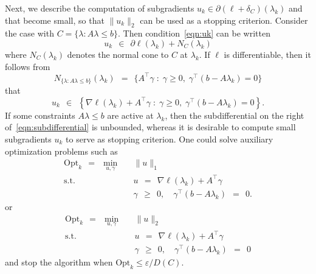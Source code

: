 \documentclass[article]{jss}
\newcommand{\ignore}[1]{}
\begin{document}
{Next, we describe the computation of subgradients $u_{k} \in \partial(\ell + \delta_{C})(\lambda_{k})$ and that become small, so that $\|u_{k}\|_{2}$ can be used as a stopping criterion.
Consider the case with $C = \{\lambda : A \lambda \leq b\}$.
Then condition~\eqref{eqn:uk} can be written 
\[
u_{k} \ \ \in \ \ \partial \ell(\lambda_{k}) + N_{C}(\lambda_{k})
\]
where $N_{C}(\lambda_{k})$ denotes the normal cone to $C$ at $\lambda_{k}$.
If $\ell$ is differentiable, then it follows from
\[
N_{\{\lambda : A \lambda \leq b\}}(\lambda_{k}) \ \ = \ \ \{A^{\top} \gamma \; : \; \gamma \geq 0, \; \gamma^{\top} (b - A \lambda_{k}) = 0\}
\]
that
\begin{equation}
\label{eqn:subdifferential}
u_{k} \ \ \in \ \ \left\{\nabla \ell(\lambda_{k}) + A^{\top} \gamma \; : \; \gamma \geq 0, \; \gamma^{\top} (b - A \lambda_{k}) = 0\right\}.
\end{equation}
If some constraints $A \lambda \leq b$ are active at $\lambda_{k}$, then the subdifferential on the right of~\eqref{eqn:subdifferential} is unbounded, whereas it is desirable to compute small subgradients $u_{k}$ to serve as stopping criterion.
One could solve auxiliary optimization problems such as
\begin{eqnarray*}
{\mbox{Opt}}_{k} \ \ = \ \ \min_{u, \gamma} & & \|u\|_{1} \\
\mbox{s.t.} & & u \ \ = \ \ \nabla \ell(\lambda_{k}) + A^{\top} \gamma \\
& & \gamma \ \ \geq \ \ 0, \quad \gamma^{\top} (b - A \lambda_{k}) \ \ = \ \ 0.
\end{eqnarray*}
or
\begin{eqnarray*}
{\mbox{Opt}}_{k} \ \ = \ \ \min_{u,\gamma} & & \|u\|_{2} \\
\mbox{s.t.} & & u \ \ = \ \ \nabla \ell(\lambda_{k}) + A^{\top} \gamma \\
& & \gamma \ \ \geq \ \ 0, \quad \gamma^{\top} (b - A \lambda_{k}) \ \ = \ \ 0
\end{eqnarray*}
and stop the algorithm when ${\mbox{Opt}}_{k} \leq \varepsilon / D(C)$.
\ignore{
In practice we can stop the algorithm when Opt$_{k}$ is small but if $C$ is not compact there is no guarantee that $\lambda_{k}$ will be an $\varepsilon$-optimal solution with $\varepsilon$ small as can be seen from this simple one dimensional example:
Consider $\ell(x) = 10^{-k} |x|$ with $k$ a large positive integer.
Then it is clear that the condition $u \in \nabla \ell(x)$ with $u$ of small norm does not imply that $\ell(x)$ is close to 0 since $|\ell'(x)| = 10^{-k}$ even if $|x| > 10^{k} \varepsilon$.
}}
\end{document}
